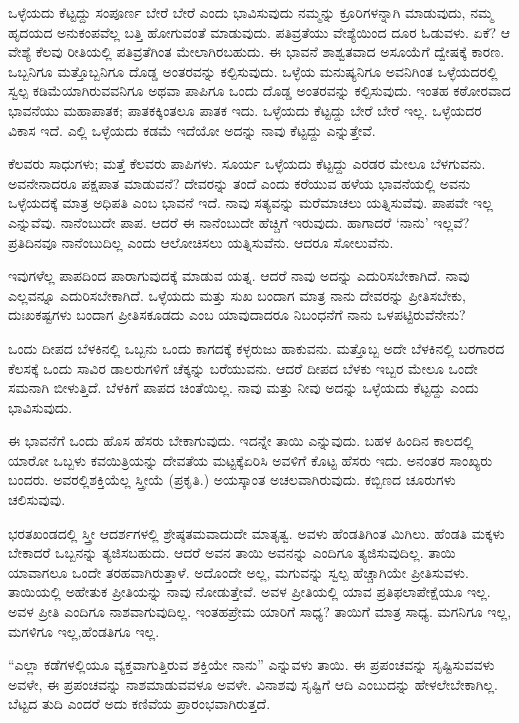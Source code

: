 ಒಳ್ಳೆಯದು ಕೆಟ್ಟದ್ದು ಸಂಪೂರ್ಣ ಬೇರೆ ಬೇರೆ ಎಂದು ಭಾವಿಸುವುದು ನಮ್ಮನ್ನು ಕ್ರೂರಿಗಳನ್ನಾಗಿ ಮಾಡುವುದು, ನಮ್ಮ ಹೃದಯದ ಅನುಕಂಪವೆಲ್ಲ ಬತ್ತಿ ಹೋಗುವಂತೆ ಮಾಡುವುದು. ಪತಿವ್ರತೆಯು ವೇಶ್ಯೆಯಿಂದ ದೂರ ಓಡುವಳು. ಏಕೆ? ಆ ವೇಶ್ಯೆ ಕೆಲವು ರೀತಿಯಲ್ಲಿ ಪತಿವ್ರತೆಗಿಂತ ಮೇಲಾಗಿರಬಹುದು. ಈ ಭಾವನೆ ಶಾಶ್ವತವಾದ ಅಸೂಯೆಗೆ ದ್ವೇಷಕ್ಕೆ ಕಾರಣ. ಒಬ್ಬನಿಗೂ ಮತ್ತೊಬ್ಬನಿಗೂ ದೊಡ್ಡ ಅಂತರವನ್ನು ಕಲ್ಪಿಸುವುದು. ಒಳ್ಳೆಯ ಮನುಷ್ಯನಿಗೂ ಅವನಿಗಿಂತ ಒಳ್ಳೆಯದರಲ್ಲಿ ಸ್ವಲ್ಪ ಕಡಿಮೆಯಾಗಿರುವವನಿಗೂ ಅಥವಾ ಪಾಪಿಗೂ ಒಂದು ದೊಡ್ಡ ಅಂತರವನ್ನು ಕಲ್ಪಿಸುವುದು. ಇಂತಹ ಕಠೋರವಾದ ಭಾವನೆಯು ಮಹಾಪಾತಕ; ಪಾತಕಕ್ಕಿಂತಲೂ ಪಾತಕ ಇದು. ಒಳ್ಳೆಯದು ಕೆಟ್ಟದ್ದು ಬೇರೆ ಬೇರೆ ಇಲ್ಲ. ಒಳ್ಳೆಯದರ ವಿಕಾಸ ಇದೆ. ಎಲ್ಲಿ ಒಳ್ಳೆಯದು ಕಡಮೆ ಇದೆಯೋ ಅದನ್ನು ನಾವು ಕೆಟ್ಟದ್ದು ಎನ್ನುತ್ತೇವೆ.

ಕೆಲವರು ಸಾಧುಗಳು; ಮತ್ತೆ ಕೆಲವರು ಪಾಪಿಗಳು. ಸೂರ್ಯ ಒಳ್ಳೆಯದು ಕೆಟ್ಟದ್ದು ಎರಡರ ಮೇಲೂ ಬೆಳಗುವನು. ಅವನೇನಾದರೂ ಪಕ್ಷಪಾತ ಮಾಡುವನೆ? ದೇವರನ್ನು ತಂದೆ ಎಂದು ಕರೆಯುವ ಹಳೆಯ ಭಾವನೆಯಲ್ಲಿ ಅವನು ಒಳ್ಳೆಯದಕ್ಕೆ ಮಾತ್ರ ಅಧಿಪತಿ ಎಂಬ ಭಾವನೆ ಇದೆ. ನಾವು ಸತ್ಯವನ್ನು ಮರೆಮಾಚಲು ಯತ್ನಿಸುವೆವು. ಪಾಪವೇ ಇಲ್ಲ ಎನ್ನುವೆವು. ನಾನೆಂಬುದೇ ಪಾಪ. ಆದರೆ ಈ ನಾನೆಂಬುದೇ ಹೆಚ್ಚಿಗೆ ಇರುವುದು. ಹಾಗಾದರೆ ‘ನಾನು’ ಇಲ್ಲವೆ? ಪ್ರತಿದಿನವೂ ನಾನೆಂಬುದಿಲ್ಲ ಎಂದು ಆಲೋಚಿಸಲು ಯತ್ನಿಸುವೆನು. ಆದರೂ ಸೋಲುವೆನು.

ಇವುಗಳೆಲ್ಲ ಪಾಪದಿಂದ ಪಾರಾಗುವುದಕ್ಕೆ ಮಾಡುವ ಯತ್ನ. ಆದರೆ ನಾವು ಅದನ್ನು ಎದುರಿಸಬೇಕಾಗಿದೆ. ನಾವು ಎಲ್ಲವನ್ನೂ ಎದುರಿಸಬೇಕಾಗಿದೆ. ಒಳ್ಳೆಯದು ಮತ್ತು ಸುಖ ಬಂದಾಗ ಮಾತ್ರ ನಾನು ದೇವರನ್ನು ಪ್ರೀತಿಸಬೇಕು, ದುಃಖಕಷ್ಟಗಳು ಬಂದಾಗ ಪ್ರೀತಿಸಕೂಡದು ಎಂಬ ಯಾವುದಾದರೂ ನಿಬಂಧನೆಗೆ ನಾನು ಒಳಪಟ್ಟಿರುವೆನೇನು?

ಒಂದು ದೀಪದ ಬೆಳಕಿನಲ್ಲಿ ಒಬ್ಬನು ಒಂದು ಕಾಗದಕ್ಕೆ ಕಳ್ಳರುಜು ಹಾಕುವನು. ಮತ್ತೊಬ್ಬ ಅದೇ ಬೆಳಕಿನಲ್ಲಿ ಬರಗಾರದ ಕೆಲಸಕ್ಕೆ ಒಂದು ಸಾವಿರ ಡಾಲರುಗಳಿಗೆ ಚೆಕ್ಕನ್ನು ಬರೆಯುವನು. ಆದರೆ ದೀಪದ ಬೆಳಕು ಇಬ್ಬರ ಮೇಲೂ ಒಂದೇ ಸಮನಾಗಿ ಬೀಳುತ್ತಿದೆ. ಬೆಳಕಿಗೆ ಪಾಪದ ಚಿಂತೆಯಿಲ್ಲ. ನಾವು ಮತ್ತು ನೀವು ಅದನ್ನು ಒಳ್ಳೆಯದು ಕೆಟ್ಟದ್ದು ಎಂದು ಭಾವಿಸುವುದು.

ಈ ಭಾವನೆಗೆ ಒಂದು ಹೊಸ ಹೆಸರು ಬೇಕಾಗುವುದು. ಇದನ್ನೇ ತಾಯಿ ಎನ್ನುವುದು. ಬಹಳ ಹಿಂದಿನ ಕಾಲದಲ್ಲಿ ಯಾರೋ ಒಬ್ಬಳು ಕವಯಿತ್ರಿಯನ್ನು ದೇವತೆಯ ಮಟ್ಟಕ್ಕೆ\break ಏರಿಸಿ ಅವಳಿಗೆ ಕೊಟ್ಟ ಹೆಸರು ಇದು. ಅನಂತರ ಸಾಂಖ್ಯರು ಬಂದರು. ಅವರಲ್ಲಿ\break ಶಕ್ತಿಯೆಲ್ಲ ಸ್ತ್ರೀಯೆ (ಪ್ರಕೃತಿ.) ಅಯಸ್ಕಾಂತ ಅಚಲವಾಗಿರುವುದು. ಕಬ್ಬಿಣದ ಚೂರುಗಳು ಚಲಿಸುವುವು.

ಭರತಖಂಡದಲ್ಲಿ ಸ್ತ್ರೀ ಆದರ್ಶಗಳಲ್ಲಿ ಶ್ರೇಷ್ಠತಮವಾದುದೇ ಮಾತೃತ್ವ. ಅವಳು ಹೆಂಡತಿಗಿಂತ ಮಿಗಿಲು. ಹೆಂಡತಿ ಮಕ್ಕಳು ಬೇಕಾದರೆ ಒಬ್ಬನನ್ನು ತ್ಯಜಿಸಬಹುದು. ಆದರೆ ಅವನ ತಾಯಿ ಅವನನ್ನು ಎಂದಿಗೂ ತ್ಯಜಿಸುವುದಿಲ್ಲ. ತಾಯಿ ಯಾವಾಗಲೂ ಒಂದೇ ತರಹವಾಗಿರುತ್ತಾಳೆ. ಅದೊಂದೇ ಅಲ್ಲ, ಮಗುವನ್ನು ಸ್ವಲ್ಪ ಹೆಚ್ಚಾಗಿಯೇ ಪ್ರೀತಿಸುವಳು. ತಾಯಿಯಲ್ಲಿ ಅಹೇತುಕ ಪ್ರೀತಿಯನ್ನು ನಾವು ನೋಡುತ್ತೇವೆ. ಅವಳ ಪ್ರೀತಿಯಲ್ಲಿ ಯಾವ ಪ್ರತಿಫಲಾಪೇಕ್ಷೆಯೂ ಇಲ್ಲ. ಅವಳ ಪ್ರೀತಿ ಎಂದಿಗೂ ನಾಶವಾಗುವುದಿಲ್ಲ. ಇಂತಹ\break ಪ್ರೇಮ ಯಾರಿಗೆ ಸಾಧ್ಯ? ತಾಯಿಗೆ ಮಾತ್ರ ಸಾಧ್ಯ. ಮಗನಿಗೂ ಇಲ್ಲ, ಮಗಳಿಗೂ ಇಲ್ಲ,\break ಹೆಂಡತಿಗೂ ಇಲ್ಲ.

“ಎಲ್ಲಾ ಕಡೆಗಳಲ್ಲಿಯೂ ವ್ಯಕ್ತವಾಗುತ್ತಿರುವ ಶಕ್ತಿಯೇ ನಾನು” ಎನ್ನುವಳು ತಾಯಿ. ಈ ಪ್ರಪಂಚವನ್ನು ಸೃಷ್ಟಿಸುವವಳು ಅವಳೇ, ಈ ಪ್ರಪಂಚವನ್ನು ನಾಶಮಾಡುವವಳೂ ಅವಳೇ. ವಿನಾಶವು ಸೃಷ್ಟಿಗೆ ಆದಿ ಎಂಬುದನ್ನು ಹೇಳಲೇಬೇಕಾಗಿಲ್ಲ. ಬೆಟ್ಟದ ತುದಿ ಎಂದರೆ ಅದು ಕಣಿವೆಯ ಪ್ರಾರಂಭವಾಗಿರುತ್ತದೆ.

